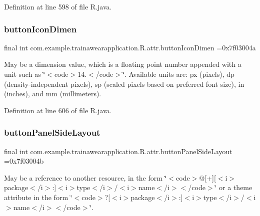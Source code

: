 Definition at line 598 of file R.\+java.

\mbox{\label{classcom_1_1example_1_1trainawearapplication_1_1_r_1_1attr_a8f82ba1103929aa752272141479894cb}} 
\subsubsection{\texorpdfstring{buttonIconDimen}{buttonIconDimen}}
{\footnotesize\ttfamily final int com.\+example.\+trainawearapplication.\+R.\+attr.\+button\+Icon\+Dimen =0x7f03004a\hspace{0.3cm}{\ttfamily [static]}}

May be a dimension value, which is a floating point number appended with a unit such as \char`\"{}$<$code$>$14.\+5sp$<$/code$>$\char`\"{}. Available units are\+: px (pixels), dp (density-\/independent pixels), sp (scaled pixels based on preferred font size), in (inches), and mm (millimeters). 

Definition at line 606 of file R.\+java.

\mbox{\label{classcom_1_1example_1_1trainawearapplication_1_1_r_1_1attr_a0a97b6623038284d1ec7d2d4d3bd72af}} 
\subsubsection{\texorpdfstring{buttonPanelSideLayout}{buttonPanelSideLayout}}
{\footnotesize\ttfamily final int com.\+example.\+trainawearapplication.\+R.\+attr.\+button\+Panel\+Side\+Layout =0x7f03004b\hspace{0.3cm}{\ttfamily [static]}}

May be a reference to another resource, in the form \char`\"{}$<$code$>$@\mbox{[}+\mbox{]}\mbox{[}$<$i$>$package$<$/i$>$\+:\mbox{]}$<$i$>$type$<$/i$>$/$<$i$>$name$<$/i$>$$<$/code$>$\char`\"{} or a theme attribute in the form \char`\"{}$<$code$>$?\mbox{[}$<$i$>$package$<$/i$>$\+:\mbox{]}$<$i$>$type$<$/i$>$/$<$i$>$name$<$/i$>$$<$/code$>$\char`\"{}. 


